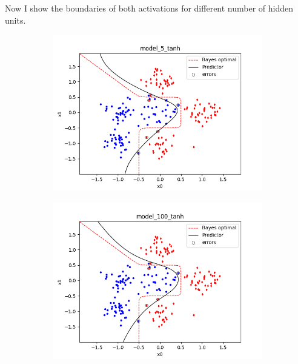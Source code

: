 \documentclass[a4paper,11pt]{article}
\begin{document}
Now I show the boundaries of both activations for different number of hidden units.
\begin{figure}[ht]
    \begin{subfigure}[b]{0.3\textwidth}
        \includegraphics[width=\textwidth]{../boundaries/model_5_tanh.png}
    \end{subfigure}
    \hfill
    \begin{subfigure}[b]{0.3\textwidth}
        \includegraphics[width=\textwidth]{../boundaries/model_100_tanh.png}
    \end{subfigure}
    \hfill
    \begin{subfigure}[b]{0.3\textwidth}

\end{subfigure}
\end{figure}
\end{document}
